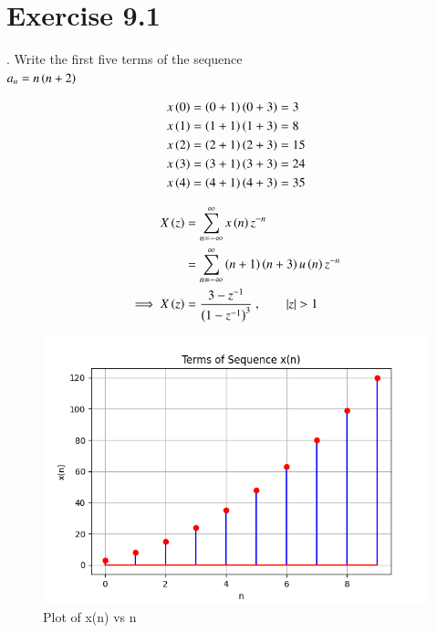 \documentclass[journal,12pt,twocolumn]{IEEEtran}
\begin{document}


\vspace{3cm}

\title{}
\author{EE23BTECH11024 - G.Karthik Yadav$^{*}$
}
\maketitle
\newpage
\bigskip



\section*{Exercise 9.1}

. \hspace{2pt}Write the first five terms of the sequence\\
$a_n = n \left(n+2\right)$

\solution



\begin{align}
	x \left(0\right) & = \left(0+1\right)\left(0+3\right) = 3 \\
x \left(1\right) & = \left(1+1\right)\left(1+3\right) = 8\\
x \left(2\right) & = \left(2+1\right)\left(2+3\right) = 15\\
x \left(3\right) & = \left(3+1\right)\left(3+3\right) = 24\\
x \left(4\right) & = \left(4+1\right)\left(4+3\right) = 35
\end{align} 


\begin{align}
    X \left(z\right) & = \sum_{n=-\infty}^{\infty} x \left(n\right)   z^{-n} \\
    & = \sum_{n=-\infty}^{\infty}  \left(n+1\right)\left(n+3\right) u \left(n\right)   z^{-n} \\
    \implies X \left(z\right) & = \frac{ 3-z^{-1}}{\left(1-z^{-1}\right)^3} \text{ ,}\qquad \left\vert z\right\vert>1
\end{align}

\begin{figure}[ht]
   \centering
   \includegraphics[width=1\columnwidth]{figs/plot.png}
   \caption{Plot of x(n) vs n}
   \label{fig: 1.11.9.1.1}
\end{figure}
\end{document}
